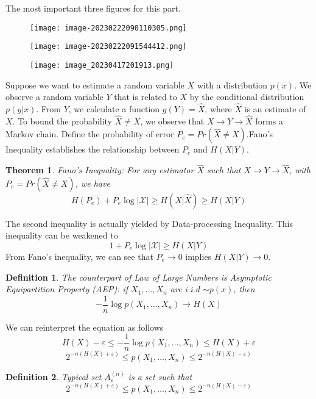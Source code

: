 \documentclass[10pt,landscape, a4paper]{article}
\newtheorem{definition}{Definition}
\newtheorem{theorem}{Theorem}
\begin{document}
\begin{multicols}{3}
The most important three figures for this part.
\begin{figure}[H]
    \centering
    \texttt{[image: image-20230222090110305.png]}
\end{figure}
\begin{figure}[H]
    \centering
    \texttt{[image: image-20230222091544412.png]}
\end{figure}
\begin{figure}[H]
    \centering
    \texttt{[image: image\_20230417201913.png]}
\end{figure}

Suppose we want to estimate a random variable $X$ with a distribution $p(x)$. We observe a random variable $Y$ that is related to $X$ by the conditional distribution $p(y|x)$. From $Y$, we calculate a function $g(Y)=\hat{X}$, where $\hat{X}$ is an estimate of $X$. To bound the probability $\hat {X}\ne X$, we observe that $X\rightarrow Y\rightarrow \hat{X}$ forms a Markov chain. Define the probability of error $P_e=Pr(\hat{X}\ne X)$.Fano's Inequality establishes the relationship between $P_e$ and $H(X|Y)$.

\begin{theorem}
    Fano's Inequality: For any estimator $\hat{X}$ such that $X\rightarrow Y\rightarrow \hat{X}$, with $P_e=Pr(\hat{X}\ne X)$, we have
    $$
    H(P_e)+P_e\log|\mathcal{X}|\ge H(X|\hat{X})\ge H(X|Y)
    $$
\end{theorem}

The second inequality is actually yielded by Data-processing Inequality. This inequality can be weakened to
$$
    1+P_e\log|\mathcal{X}|\ge H(X|Y)
$$
From Fano's inequality, we can see that $P_e\rightarrow 0$ implies $H(X|Y)\rightarrow 0$.

\begin{definition}
    The counterpart of Law of Large Numbers is Asymptotic Equipartition Property (AEP): if $X_1,\dots, X_n$ are i.i.d $\sim p(x)$, then
    $$
    -\frac{1}{n}\log p(X_1,\dots, X_n)\rightarrow H(X)
    $$
\end{definition}

We can reinterpret the equation as follows
$$
H(X)-\varepsilon\le-\frac{1}{n}\log p(X_1,\dots, X_n)\le H(X)+\varepsilon
$$
$$
2^{-n(H(X)+\varepsilon)}\le p(X_1,\dots, X_n)\le 2^{-n(H(X)-\varepsilon)}
$$

\begin{definition}
    Typical set $A_{\varepsilon}^{(n)}$ is a set such that
    $$
    2^{-n(H(X)+\varepsilon)}\le p(X_1,\dots, X_n)\le 2^{-n(H(X)-\varepsilon)}
    $$
\end{definition}


\end{multicols}
\end{document}
